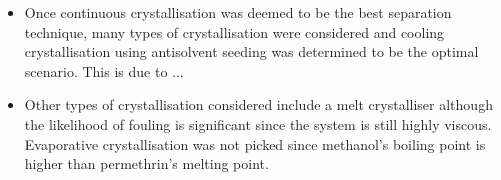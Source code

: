    \begin{itemize}
    \item Once continuous crystallisation was deemed to be the best separation technique, many types of crystallisation were considered and cooling crystallisation using antisolvent seeding was determined to be the optimal scenario. This is due to ... 
    \item Other types of crystallisation considered include a melt crystalliser although the likelihood of fouling is significant since the system is still highly viscous. Evaporative crystallisation was not picked since methanol's boiling point is higher than permethrin's melting point.
    \end{itemize}
    

